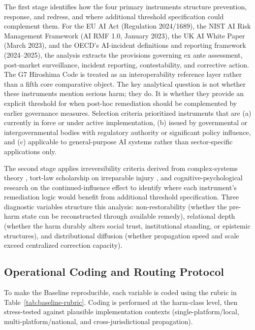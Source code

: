 \documentclass[11pt]{article}
\begin{document}
The first stage identifies how the four primary instruments structure prevention, response, and redress, and where additional threshold specification could complement them. For the EU AI Act (Regulation 2024/1689), the NIST AI Risk Management Framework (AI RMF 1.0, January 2023), the UK AI White Paper (March 2023), and the OECD's AI-incident definitions and reporting framework (2024--2025), the analysis extracts the provisions governing ex ante assessment, post-market surveillance, incident reporting, contestability, and corrective action. The G7 Hiroshima Code is treated as an interoperability reference layer rather than a fifth core comparative object. The key analytical question is not whether these instruments mention serious harm; they do. It is whether they provide an explicit threshold for when post-hoc remediation should be complemented by earlier governance measures. Selection criteria prioritized instruments that are (a) currently in force or under active implementation, (b) issued by governmental or intergovernmental bodies with regulatory authority or significant policy influence, and (c) applicable to general-purpose AI systems rather than sector-specific applications only.

The second stage applies irreversibility criteria derived from complex-systems theory \parencite{scheffer2009}, tort-law scholarship on irreparable injury \parencite{keating2023,walker2006}, and cognitive-psychological research on the continued-influence effect \parencite{ecker2022} to identify where each instrument's remediation logic would benefit from additional threshold specification. Three diagnostic variables structure this analysis: non-restorability (whether the pre-harm state can be reconstructed through available remedy), relational depth (whether the harm durably alters social trust, institutional standing, or epistemic structures), and distributional diffusion (whether propagation speed and scale exceed centralized correction capacity).

\subsection*{Operational Coding and Routing Protocol}

To make the Baseline reproducible, each variable is coded using the rubric in Table~\ref{tab:baseline-rubric}. Coding is performed at the harm-class level, then stress-tested against plausible implementation contexts (single-platform/local, multi-platform/national, and cross-jurisdictional propagation).
\end{document}

